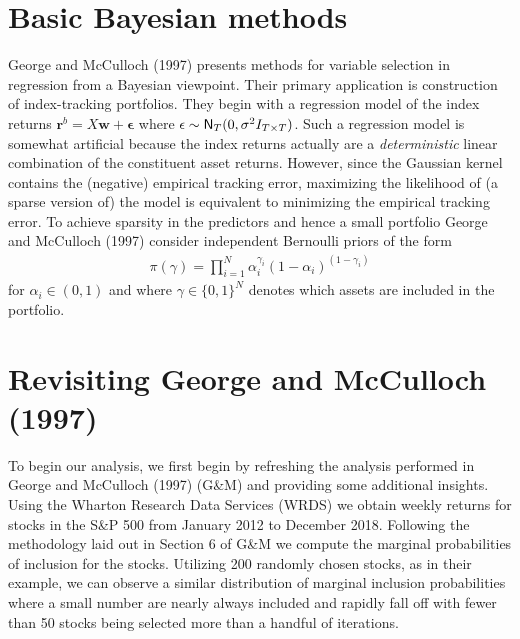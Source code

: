 \documentclass[a4paper, 12pt]{article}
\theoremstyle{plain}
\theoremstyle{definition}
\theoremstyle{remark}
\newcommand{\nm}{{\sf N}}
\begin{document}
\section{Basic Bayesian methods}

George and McCulloch (1997) presents methods for variable selection in regression from a Bayesian viewpoint.  Their primary application is construction of index-tracking portfolios.  They begin with a regression model of the index returns
$\mathbf{r}^b = X \mathbf{w} + \mathbf{\epsilon}$
where $\mathbf{\epsilon}\sim \nm_T(0,\sigma^2I_{T\times T})$.  Such a regression model is somewhat artificial because the index returns actually are a \emph{deterministic} linear combination of the constituent asset returns.  However, since the Gaussian kernel contains the (negative) empirical tracking error, maximizing the likelihood of (a sparse version of) the model is equivalent to minimizing the empirical tracking error.  To achieve sparsity in the predictors and hence a small portfolio George and McCulloch (1997) consider independent Bernoulli priors of the form
\begin{align}
\pi(\gamma) = \prod_{i=1}^N\alpha_i^{\gamma_i}(1-\alpha_i)^{(1-\gamma_i)}
\end{align}
for $\alpha_i\in(0,1)$ and where $\gamma \in \{0,1\}^N$ denotes which assets are included in the portfolio.  


\section{Revisiting George and McCulloch (1997)}

To begin our analysis, we first begin by refreshing the analysis performed in George and McCulloch (1997) (G\&M) and providing some additional insights. Using the Wharton Research Data Services (WRDS) we obtain weekly returns for stocks in the S\&P 500 from January 2012 to December 2018. Following the methodology laid out in Section 6 of G\&M we compute the marginal probabilities of inclusion for the stocks. Utilizing 200 randomly chosen stocks, as in their example, we can observe a similar distribution of marginal inclusion probabilities where a small number are nearly always included and rapidly fall off with fewer than 50 stocks being selected more than a handful of iterations.
\end{document}
